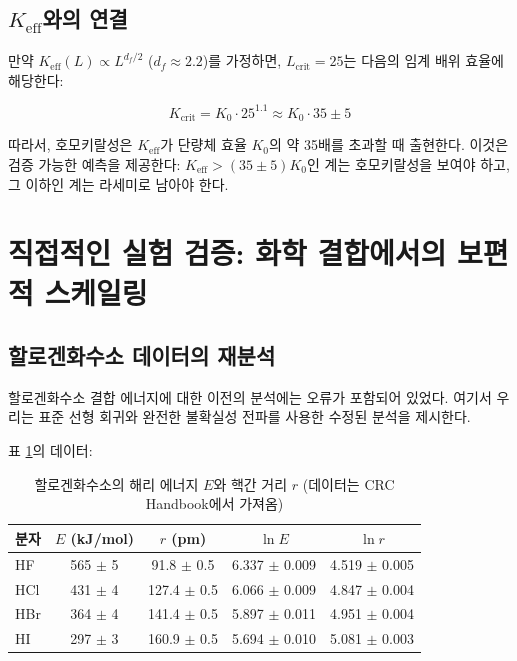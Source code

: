 \documentclass[12pt,a4paper]{article}
\newcommand{\Keff}{K_{\mathrm{eff}}}
\newcommand{\df}{d_{\!f}}
\newcommand{\Kcrit}{K_{\mathrm{crit}}}
\begin{document}
	\subsection{$\Keff$와의 연결}
	
	만약 $\Keff(L) \propto L^{\df/2}$ ($\df \approx 2.2$)를 가정하면, $L_{\text{crit}} = 25$는 다음의 임계 배위 효율에 해당한다:
	
	\begin{equation}
		\Kcrit = K_0 \cdot 25^{1.1} \approx K_0 \cdot 35 \pm 5
		\label{eq:Kcrit-from-L}
	\end{equation}
	
	따라서, 호모키랄성은 $\Keff$가 단량체 효율 $K_0$의 약 35배를 초과할 때 출현한다. 이것은 검증 가능한 예측을 제공한다: $\Keff > (35 \pm 5) K_0$인 계는 호모키랄성을 보여야 하고, 그 이하인 계는 라세미로 남아야 한다.
	
	\section{직접적인 실험 검증: 화학 결합에서의 보편적 스케일링}
	\label{sec:experimental-verification}
	
	\subsection{할로겐화수소 데이터의 재분석}
	
	할로겐화수소 결합 에너지에 대한 이전의 분석에는 오류가 포함되어 있었다. 여기서 우리는 표준 선형 회귀와 완전한 불확실성 전파를 사용한 수정된 분석을 제시한다.
	
	표 \ref{tab:HX}의 데이터:
	
	\begin{table}[htbp]
		\centering
		\caption{할로겐화수소의 해리 에너지 $E$와 핵간 거리 $r$ (데이터는 CRC Handbook에서 가져옴)}
		\label{tab:HX}
		\begin{tabular}{lcccc}
			\toprule
			분자 & $E$ (kJ/mol) & $r$ (pm) & $\ln E$ & $\ln r$ \\
			\midrule
			HF & 565 $\pm$ 5 & 91.8 $\pm$ 0.5 & 6.337 $\pm$ 0.009 & 4.519 $\pm$ 0.005 \\
			HCl & 431 $\pm$ 4 & 127.4 $\pm$ 0.5 & 6.066 $\pm$ 0.009 & 4.847 $\pm$ 0.004 \\
			HBr & 364 $\pm$ 4 & 141.4 $\pm$ 0.5 & 5.897 $\pm$ 0.011 & 4.951 $\pm$ 0.004 \\
			HI  & 297 $\pm$ 3 & 160.9 $\pm$ 0.5 & 5.694 $\pm$ 0.010 & 5.081 $\pm$ 0.003 \\
			\bottomrule
		\end{tabular}
	\end{table}
	
\end{document}

